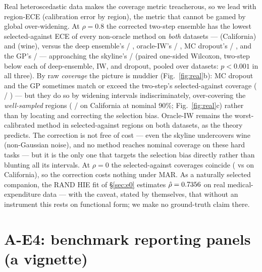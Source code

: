 \documentclass[10pt]{article}
\begin{document}
Real heteroscedastic data makes the coverage metric treacherous, so we
lead with region-ECE (calibration error by region), the metric that
cannot be gamed by global over-widening. At $\rho = 0.8$ the corrected
two-step ensemble has the lowest selected-against ECE of every non-oracle
method on \emph{both} datasets --- \RealECECalHeckTS{} (California) and
\RealECEWineHeckTS{} (wine), versus the deep ensemble's \RealECECalEns{} /
\RealECEWineEns{}, oracle-IW's \RealECECalIW{} / \RealECEWineIW{}, MC
dropout's \RealECECalDrop{} / \RealECEWineDrop{}, and the GP's
\RealECECalGP{} / \RealECEWineGP{} --- approaching the skyline's
\RealECECalSky{} / \RealECEWineSky{} (paired one-sided Wilcoxon, two-step
below each of deep-ensemble, IW, and dropout, pooled over datasets:
$p < 0.001$ in all three). By raw \emph{coverage} the picture is muddier
(Fig.~\ref{fig:real}b): MC dropout and the GP sometimes match or exceed
the two-step's selected-against coverage (\RealCovCalHeckTS{} /
\RealCovWineHeckTS{}) --- but they do so by widening intervals
indiscriminately, over-covering the \emph{well-sampled} regions
(\RealCovWellCalGP{} / \RealCovWellCalDrop{} on California at nominal
90\%; Fig.~\ref{fig:real}c) rather than by locating and correcting the
selection bias. Oracle-IW remains the worst-calibrated method in
selected-against regions on both datasets, as the theory predicts. The
correction is not free of cost --- even the skyline undercovers wine
(non-Gaussian noise), and no method reaches nominal coverage on these
hard tasks --- but it is the only one that targets the selection bias
directly rather than blunting all its intervals. At $\rho = 0$ the
selected-against coverages coincide (\RealCovZeroCalEns{} vs
\RealCovZeroCalHeckTS{} on California), so the correction costs nothing
under MAR. As a naturally selected companion, the RAND HIE fit of
\S\ref{sec:e0} estimates $\hat\rho = 0.7356$ on real
medical-expenditure data --- with the caveat, stated by
\citet{cameron2005} themselves, that without an instrument this rests on
functional form; we make no ground-truth claim there.

\section{A-E4: benchmark reporting panels (a vignette)}
\label{sec:e4}
\end{document}
